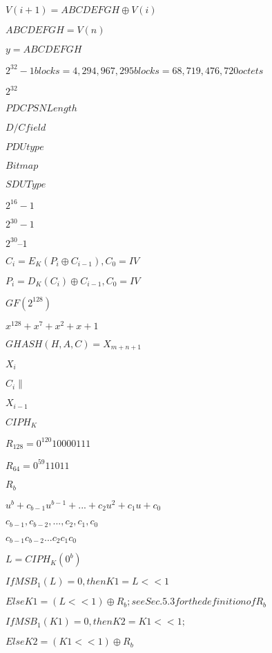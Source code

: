 \documentclass{article}
\begin{document}
$ V(i+1) = ABCDEFGH \oplus V(i)$
\pagebreak

$ ABCDEFGH = V(n)$
\pagebreak

$ y=ABCDEFGH$
\pagebreak

$ {2}^{32}-1 blocks = 4,294,967,295 blocks = 68,719,476,720 octets $
\pagebreak

${2}^{32}$
\pagebreak

$ PDCP SN Length$
\pagebreak

$ D/C field$
\pagebreak

$ PDU type$
\pagebreak

$ Bitmap$
\pagebreak

$ SDU Type$
\pagebreak

${2}^{16}-1$
\pagebreak

${2}^{30}-1$
\pagebreak

${2}^{30}–1$
\pagebreak

${C}_{i}={E}_{K}(P_{i}\oplus C_{i-1}),C_{0}=IV$
\pagebreak

$P_{i}=D_{K}(C_{i})\oplus C_{i-1},C_{0}=IV$
\pagebreak

$GF({2}^{128})$
\pagebreak

${x}^{128}+{x}^{7}+{x}^{2}+x+1$
\pagebreak

$GHASH(H,A,C)=X_{m+n+1}$
\pagebreak

$X_{i}$
\pagebreak

$C_{i} \parallel$
\pagebreak

$ X_{i−1} $
\pagebreak

${CIPH}_{K}$
\pagebreak

${R}_{128} = {0}^{120}10000111$
\pagebreak

${R}_{64} = {0}^{59}11011$
\pagebreak

${R}_{b}$
\pagebreak

${u}^{b}+{c}_{b-1}{u}^{b-1}+...+{c}_{2}{u}^{2}+{c}_{1}u+{c}_{0}$
\pagebreak

${c}_{b-1}, {c}_{b-2}, ..., {c}_{2}, {c}_{1}, {c}_{0}$
\pagebreak

${c}_{b-1}{c}_{b-2}...{c}_{2}{c}_{1}{c}_{0}$
\pagebreak

$L = {CIPH}_{K}({0}^{b})$
\pagebreak

$If {MSB}_{1}(L) = 0, then K1 = L << 1$
\pagebreak

$Else K1 = (L << 1) \oplus {R}_{b}; see Sec. 5.3 for the definition of {R}_{b}$
\pagebreak

$If {MSB}_{1}(K1) = 0, then K2 = K1 << 1;$
\pagebreak

$Else K2 = (K1 << 1) \oplus {R}_{b}$
\pagebreak
\end{document}
